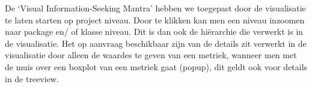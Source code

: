 \documentclass[a4paper]{article}
\begin{document}
De `Visual Information-Seeking Mantra' hebben we toegepast door de visualisatie te laten starten op project niveau. Door te klikken kan men een niveau inzoomen naar package en/ of klasse niveau. Dit is dan ook de hiërarchie die verwerkt is in de visualisatie. Het op aanvraag beschikbaar zijn van de details zit verwerkt in de visualisatie door alleen de waardes te geven van een metriek, wanneer men met de muis over een boxplot van een metriek gaat (popup), dit geldt ook voor details in de treeview.



\end{document}
